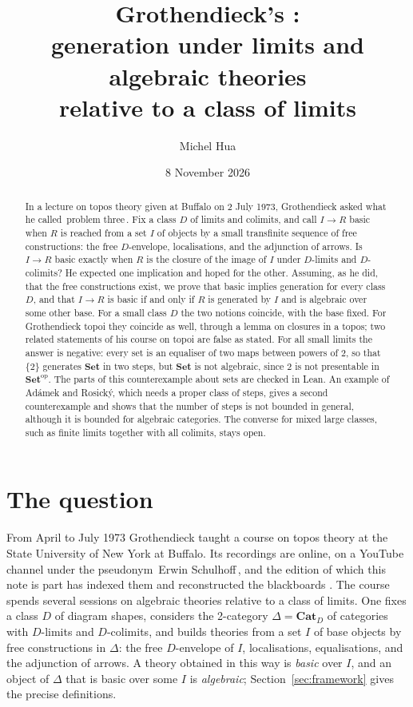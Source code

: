 \documentclass[11pt,a4paper]{amsart}
\title[Grothendieck's problem three]{Grothendieck's \q{problem three}:\\ generation under limits and algebraic theories\\ relative to a class of limits}
\author{Michel Hua}
\date{8 November 2026}
\theoremstyle{definition}
\theoremstyle{remark}
\newcommand{\q}[1]{\guillemotleft\,#1\,\guillemotright}
\newcommand{\Set}{\mathbf{Set}}
\newcommand{\Cat}{\mathbf{Cat}}
\begin{document}
\begin{abstract}
In a lecture on topos theory given at Buffalo on 2 July 1973, Grothendieck asked what he called \q{problem three}. Fix a class $D$ of limits and colimits, and call $I\to R$ basic when $R$ is reached from a set $I$ of objects by a small transfinite sequence of free constructions: the free $D$-envelope, localisations, and the adjunction of arrows. Is $I\to R$ basic exactly when $R$ is the closure of the image of $I$ under $D$-limits and $D$-colimits? He expected one implication and hoped for the other. Assuming, as he did, that the free constructions exist, we prove that basic implies generation for every class $D$, and that $I\to R$ is basic if and only if $R$ is generated by $I$ and is algebraic over some other base. For a small class $D$ the two notions coincide, with the base fixed. For Grothendieck topoi they coincide as well, through a lemma on closures in a topos; two related statements of his course on topoi are false as stated. For all small limits the answer is negative: every set is an equaliser of two maps between powers of $2$, so that $\{2\}$ generates $\Set$ in two steps, but $\Set$ is not algebraic, since $2$ is not presentable in $\Set^{\mathrm{op}}$. The parts of this counterexample about sets are checked in Lean. An example of Adámek and Rosický, which needs a proper class of steps, gives a second counterexample and shows that the number of steps is not bounded in general, although it is bounded for algebraic categories. The converse for mixed large classes, such as finite limits together with all colimits, stays open.
\end{abstract}
\maketitle

\section{The question}\label{sec:question}

From April to July 1973 Grothendieck taught a course on topos theory at the State University of New York at Buffalo. Its recordings are online, on a YouTube channel under the pseudonym \q{Erwin Schulhoff}, and the edition of which this note is part has indexed them and reconstructed the blackboards \cite{repo}. The course spends several sessions on algebraic theories relative to a class of limits. One fixes a class $D$ of diagram shapes, considers the 2-category $\Delta=\Cat_D$ of categories with $D$-limits and $D$-colimits, and builds theories from a set $I$ of base objects by free constructions in $\Delta$: the free $D$-envelope of $I$, localisations, equalisations, and the adjunction of arrows. A theory obtained in this way is \emph{basic} over $I$, and an object of $\Delta$ that is basic over some $I$ is \emph{algebraic}; Section~\ref{sec:framework} gives the precise definitions.
\end{document}
